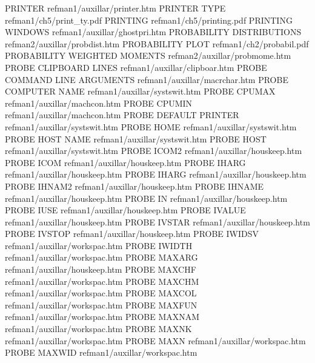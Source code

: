 PRINTER                                 refman1/auxillar/printer.htm
PRINTER TYPE                            refman1/ch5/print_ty.pdf
PRINTING                                refman1/ch5/printing.pdf
PRINTING WINDOWS                        refman1/auxillar/ghostpri.htm
PROBABILITY DISTRIBUTIONS               refman2/auxillar/probdist.htm
PROBABILITY PLOT                        refman1/ch2/probabil.pdf
PROBABILITY WEIGHTED MOMENTS            refman2/auxillar/probmome.htm
PROBE CLIPBOARD LINES                   refman1/auxillar/clipboar.htm
PROBE COMMAND LINE ARGUMENTS            refman1/auxillar/macrchar.htm
PROBE COMPUTER NAME                     refman1/auxillar/systswit.htm
PROBE CPUMAX                            refman1/auxillar/machcon.htm
PROBE CPUMIN                            refman1/auxillar/machcon.htm
PROBE DEFAULT PRINTER                   refman1/auxillar/systswit.htm
PROBE HOME                              refman1/auxillar/systswit.htm
PROBE HOST NAME                         refman1/auxillar/systswit.htm
PROBE HOST                              refman1/auxillar/systswit.htm
PROBE ICOM2                             refman1/auxillar/houskeep.htm
PROBE ICOM                              refman1/auxillar/houskeep.htm
PROBE IHARG                             refman1/auxillar/houskeep.htm
PROBE IHARG                             refman1/auxillar/houskeep.htm
PROBE IHNAM2                            refman1/auxillar/houskeep.htm
PROBE IHNAME                            refman1/auxillar/houskeep.htm
PROBE IN                                refman1/auxillar/houskeep.htm
PROBE IUSE                              refman1/auxillar/houskeep.htm
PROBE IVALUE                            refman1/auxillar/houskeep.htm
PROBE IVSTAR                            refman1/auxillar/houskeep.htm
PROBE IVSTOP                            refman1/auxillar/houskeep.htm
PROBE IWIDSV                            refman1/auxillar/workspac.htm
PROBE IWIDTH                            refman1/auxillar/workspac.htm
PROBE MAXARG                            refman1/auxillar/houskeep.htm
PROBE MAXCHF                            refman1/auxillar/workspac.htm
PROBE MAXCHM                            refman1/auxillar/workspac.htm
PROBE MAXCOL                            refman1/auxillar/workspac.htm
PROBE MAXFUN                            refman1/auxillar/workspac.htm
PROBE MAXNAM                            refman1/auxillar/workspac.htm
PROBE MAXNK                             refman1/auxillar/workspac.htm
PROBE MAXN                              refman1/auxillar/workspac.htm
PROBE MAXWID                            refman1/auxillar/workspac.htm
